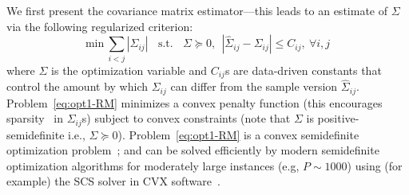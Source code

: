 
We first present the \Robocov{} covariance matrix estimator---this leads to an estimate of $\Sigma$ via the following regularized criterion: 
\begin{equation}\label{eq:opt1-RM}
    \text{min} ~ \sum_{i<j} |\Sigma_{ij}|~~
    ~~\text{s.t.}~~~~\Sigma \succeq 0,~~
   | \hat{\Sigma}_{ij} - \Sigma_{ij} |  \leq  C_{ij},  ~\forall i,j
\end{equation}
where $\Sigma$ is the optimization variable and $C_{ij}$s are data-driven constants that control the amount by which $\Sigma_{ij}$ can differ from the sample version $\hat{\Sigma}_{ij}$. Problem~\eqref{eq:opt1-RM} minimizes a convex penalty function (this encourages sparsity~\cite{hastie2015statistical} in $\Sigma_{ij}$s) subject to convex constraints (note that $\Sigma$ is positive-semidefinite i.e., $\Sigma \succeq 0$). Problem~\eqref{eq:opt1-RM} is a convex semidefinite optimization problem~\cite{BV2004}; and can be solved efficiently by modern semidefinite optimization algorithms for moderately large instances (e.g, $P \sim 1000$) using (for example) the SCS solver in CVX software~\cite{BV2004,o2016conic,Boyd2004, Fu2017}.


